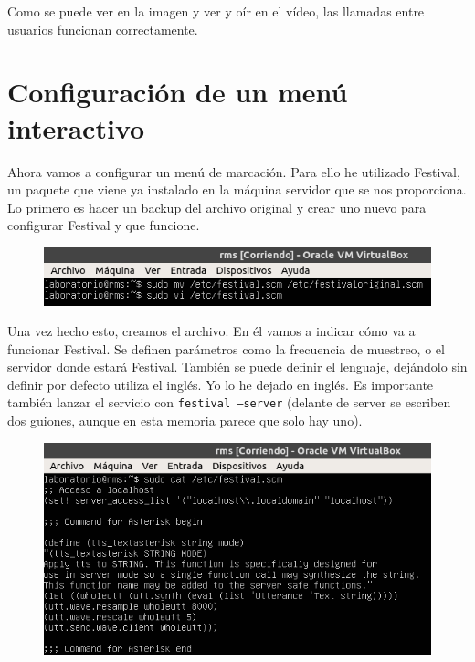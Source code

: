 \documentclass[11pt,a4paper]{article}
\begin{document}
Como se puede ver en la imagen y ver y oír en el vídeo, las llamadas entre usuarios funcionan correctamente.

\newpage

\section{Configuración de un menú interactivo}

Ahora vamos a configurar un menú de marcación. Para ello he utilizado Festival, un paquete que viene ya instalado en la máquina servidor que se nos proporciona.\\

Lo primero es hacer un backup del archivo original y crear uno nuevo para configurar Festival y que funcione.

\begin{figure}[H]
	\centering
	\includegraphics[scale=0.7]{img/14.png}
\end{figure}

Una vez hecho esto, creamos el archivo. En él vamos a indicar cómo va a funcionar Festival. Se definen parámetros como la frecuencia de muestreo, o el servidor donde estará Festival. También se puede definir el lenguaje, dejándolo sin definir por defecto utiliza el inglés. Yo lo he dejado en inglés. Es importante también lanzar el servicio con \texttt{festival --server} (delante de server se escriben dos guiones, aunque en esta memoria parece que solo hay uno).

\begin{figure}[H]
	\centering
	\includegraphics[scale=0.7]{img/15.png}
\end{figure}
\end{document}
